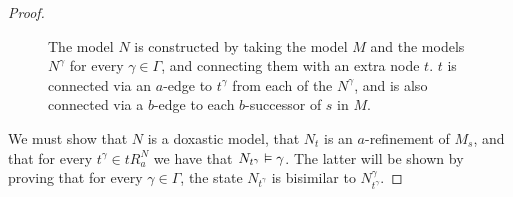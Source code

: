 \begin{proof}
\begin{figure}[H]
\begin{center} %
\caption{
The model $N$ is constructed by taking the model $M$ and the models $N^\gamma$
for every $\gamma \in \Gamma$, and connecting them with an extra node $t$. $t$
is connected via an $a$-edge to $t^\gamma$ from each of the $N^\gamma$, and is
also connected via a $b$-edge to each $b$-successor of $s$ in $M$.
}
\end{center}
\end{figure}

We must show that $N$ is a doxastic model, that $N_t$ is an $a$-refinement of
$M_s$, and that for every $t^\gamma \in tR^N_a$ we have that $N_{t^\gamma}
\vDash \gamma$. The latter will be shown by proving that for every $\gamma \in
\Gamma$, the state $N_{t^\gamma}$ is bisimilar to $N^\gamma_{t^\gamma}$.


\end{proof}
